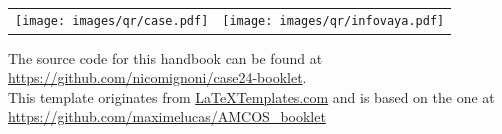 \documentclass[
	openany, %
	parskip=full, %
	12pt, %
	a4paper, %
]{conferencebooklet} %
\begin{document}


\newpage



\thispagestyle{empty} %

~\vfill %

\begin{center}
    \begin{tabular}{cc}
    	\texttt{[image: images/qr/case.pdf]} \hspace{20mm} & \texttt{[image: images/qr/infovaya.pdf]}
    \end{tabular}
\end{center}

\begin{center}	
    The source code for this handbook can be found at \url{https://github.com/nicomignoni/case24-booklet}. \\ This template originates from \url{LaTeXTemplates.com} and is based on the one at  \url{https://github.com/maximelucas/AMCOS\_booklet}
\end{center}

\newpage
\thispagestyle{empty} %
~

\newpage
\thispagestyle{empty} %
~

\newpage

\newpage



\tableofcontents

\newpage
\thispagestyle{empty} %
~

\end{document}
